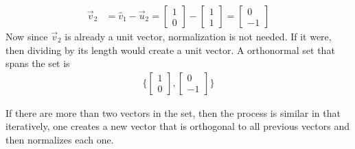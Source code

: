 \begin{example}
\begin{align*}
\vec{v}_2 & = \hat{v}_1 - \vec{u}_2 = \begin{bmatrix}
1 \\ 0
\end{bmatrix} - \begin{bmatrix}
1 \\ 1 
\end{bmatrix} = \begin{bmatrix}
0 \\ -1 
\end{bmatrix}
\end{align*}
Now since $\vec{v}_2$ is already a unit vector, normalization is not needed.  If it were, then dividing by its length would create a unit vector.  A orthonormal set that spans the set is 
%
\begin{align*}
\{ \begin{bmatrix}
1\\0 
\end{bmatrix}, \begin{bmatrix}
0 \\ -1
\end{bmatrix} \} 
\end{align*}


\end{example}

If there are more than two vectors in the set, then the process is similar in that iteratively, one creates a new vector that is orthogonal to all previous vectors and then normalizes each one.


